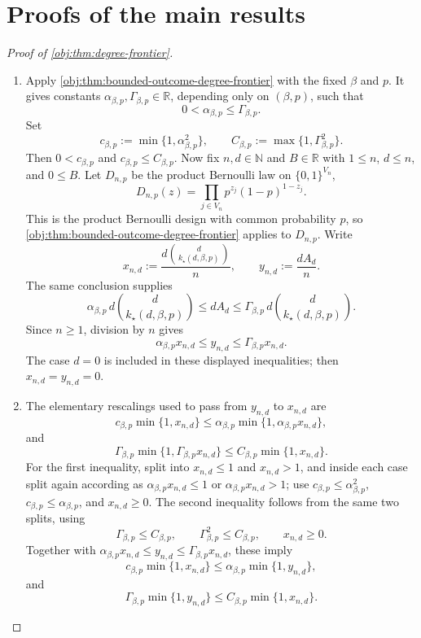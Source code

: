 \documentclass[11pt]{article}
\begin{document}
\section{Proofs of the main results}\label{sec:deferred-proofs}

\begin{proof}[Proof of \cref{obj:thm:degree-frontier}]
\begin{enumerate}
\item
Apply \cref{obj:thm:bounded-outcome-degree-frontier} with the fixed \(\beta\) and \(p\).  It gives constants
\(\alpha_{\beta,p},\Gamma_{\beta,p}\in\mathbb R\), depending only on \((\beta,p)\), such that
\[
0<\alpha_{\beta,p}\le \Gamma_{\beta,p}.
\]
Set
\[
c_{\beta,p}:=\min\{1,\alpha_{\beta,p}^{2}\},
\qquad
C_{\beta,p}:=\max\{1,\Gamma_{\beta,p}^{2}\}.
\]
Then \(0<c_{\beta,p}\) and \(c_{\beta,p}\le C_{\beta,p}\).  Now fix \(n,d\in\mathbb N\) and \(B\in\mathbb R\) with \(1\le n\), \(d\le n\), and \(0\le B\).  Let \(D_{n,p}\) be the product Bernoulli law on \(\{0,1\}^{V_n}\),
\[
D_{n,p}(z)=\prod_{j\in V_n}p^{z_j}(1-p)^{1-z_j}.
\]
This is the product Bernoulli design with common probability \(p\), so \cref{obj:thm:bounded-outcome-degree-frontier} applies to \(D_{n,p}\).  Write
\[
x_{n,d}:=\frac{d\binom{d}{k_\star(d,\beta,p)}}{n},
\qquad
y_{n,d}:=\frac{dA_d}{n}.
\]
The same conclusion supplies
\[
\alpha_{\beta,p}\,d\binom{d}{k_\star(d,\beta,p)}
\le dA_d
\le
\Gamma_{\beta,p}\,d\binom{d}{k_\star(d,\beta,p)}.
\]
Since \(n\ge1\), division by \(n\) gives
\[
\alpha_{\beta,p}x_{n,d}\le y_{n,d}\le \Gamma_{\beta,p}x_{n,d}.
\]
The case \(d=0\) is included in these displayed inequalities; then \(x_{n,d}=y_{n,d}=0\). %

\item
The elementary rescalings used to pass from \(y_{n,d}\) to \(x_{n,d}\) are
\[
c_{\beta,p}\min\{1,x_{n,d}\}
\le
\alpha_{\beta,p}\min\{1,\alpha_{\beta,p}x_{n,d}\},
\]
and
\[
\Gamma_{\beta,p}\min\{1,\Gamma_{\beta,p}x_{n,d}\}
\le
C_{\beta,p}\min\{1,x_{n,d}\}.
\]
For the first inequality, split into \(x_{n,d}\le1\) and \(x_{n,d}>1\), and inside each case split again according as \(\alpha_{\beta,p}x_{n,d}\le1\) or \(\alpha_{\beta,p}x_{n,d}>1\); use \(c_{\beta,p}\le\alpha_{\beta,p}^{2}\), \(c_{\beta,p}\le\alpha_{\beta,p}\), and \(x_{n,d}\ge0\).  The second inequality follows from the same two splits, using
\[
\Gamma_{\beta,p}\le C_{\beta,p},
\qquad
\Gamma_{\beta,p}^{2}\le C_{\beta,p},
\qquad
x_{n,d}\ge0.
\]
Together with \(\alpha_{\beta,p}x_{n,d}\le y_{n,d}\le \Gamma_{\beta,p}x_{n,d}\), these imply
\[
c_{\beta,p}\min\{1,x_{n,d}\}
\le
\alpha_{\beta,p}\min\{1,y_{n,d}\},
\]
and
\[
\Gamma_{\beta,p}\min\{1,y_{n,d}\}
\le
C_{\beta,p}\min\{1,x_{n,d}\}.
\] %


\end{enumerate}
\end{proof}
\end{document}
